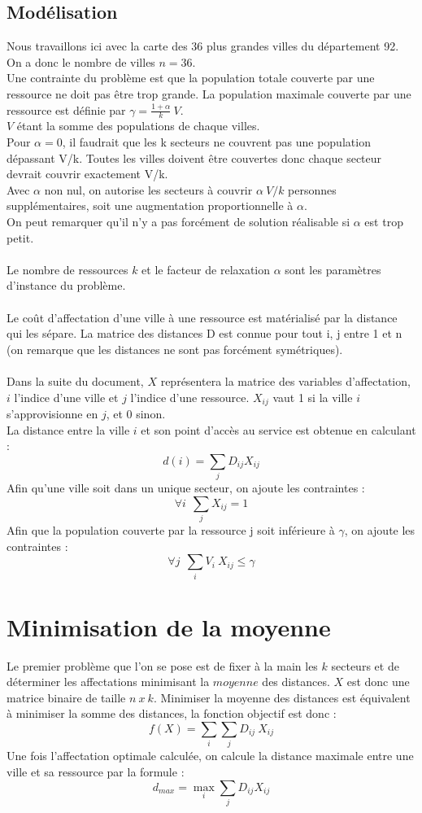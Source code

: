 \documentclass[12pt]{article}
\begin{document}
\subsection{Modélisation}
Nous travaillons ici avec la carte des 36 plus grandes villes du département 92. On a donc le nombre de villes $n=36$.
\\
Une contrainte du problème est que la population totale couverte par une ressource ne doit pas être trop grande. La population maximale couverte par une ressource est définie par
$\gamma = \frac {1+\alpha} {k} \: V$.
\\
$V$ étant la somme des populations de chaque villes.
\\
Pour $\alpha=0$, il faudrait que les k secteurs ne couvrent pas une population dépassant V/k. Toutes les villes doivent être couvertes donc chaque secteur devrait couvrir exactement V/k.
\\
Avec $\alpha$ non nul, on autorise les secteurs à couvrir $\alpha \: V/k$ personnes supplémentaires, soit une augmentation proportionnelle à $\alpha$.
\\
On peut remarquer qu'il n'y a pas forcément de solution réalisable si $\alpha$ est trop petit.
\\\\
Le nombre de ressources $k$ et le facteur de relaxation $\alpha$ sont les paramètres d'instance du problème.
\\\\
Le coût d'affectation d'une ville à une ressource est matérialisé par la distance qui les sépare. La matrice des distances D est connue pour tout i, j entre 1 et n (on remarque que les distances ne sont pas forcément symétriques).
\\\\
Dans la suite du document, $X$ représentera la matrice des variables d'affectation, $i$ l'indice d'une ville et $j$ l'indice d'une ressource. $X_{ij}$ vaut 1 si la ville $i$ s'approvisionne en $j$, et 0 sinon.
\\
La distance entre la ville $i$ et son point d'accès au service est obtenue en calculant :
\[d(i) = \sum_j {D_{ij} X_{ij}}\]
Afin qu'une ville soit dans un unique secteur, on ajoute les contraintes :
\[\forall i \:\: \sum_j X_{ij} = 1\]
Afin que la population couverte par la ressource j soit inférieure à $\gamma$, on ajoute les contraintes :
\[\forall j \:\: \sum_i V_i \: X_{ij} \leq \gamma\]



\section{Minimisation de la moyenne}
Le premier problème que l'on se pose est de fixer à la main les $k$ secteurs et de déterminer les affectations minimisant la $moyenne$ des distances.
$X$ est donc une matrice binaire de taille $n\:x\:k$. Minimiser la moyenne des distances est équivalent à minimiser la somme des distances, la fonction objectif est donc :
\[f(X) = \sum_i \sum_j D_{ij} \: X_{ij} \]
Une fois l'affectation optimale calculée, on calcule la distance maximale entre une ville et sa ressource par la formule :
\[d_{max} = \max_i \sum_j D_{ij} X_{ij}\]
\end{document}
